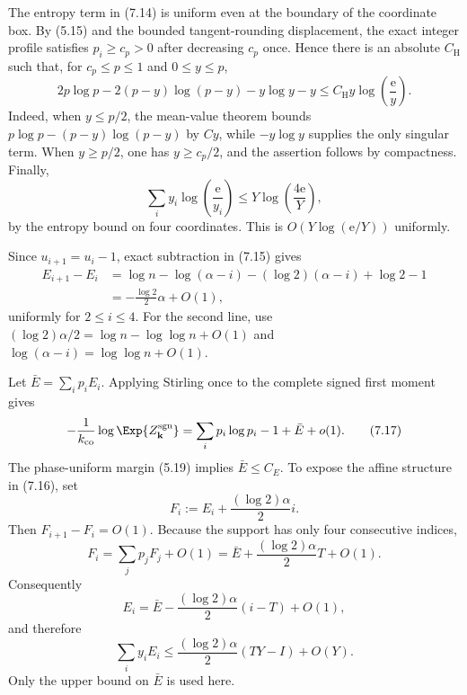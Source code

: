 The entropy term in (7.14) is uniform even at the boundary of the coordinate
box. By (5.15) and the bounded tangent-rounding displacement, the exact integer
profile satisfies $p_i\ge c_p>0$ after decreasing $c_p$ once. Hence there is an
absolute $C_{\mathrm H}$ such that, for $c_p\le p\le1$ and $0\le y\le p$,
\begin{equation*}
  2p\log p-2(p-y)\log(p-y)-y\log y-y
  \le C_{\mathrm H}y\log\!\left(\frac{\mathrm e}{y}\right).
  \tag{7.14a}
\end{equation*}
Indeed, when $y\le p/2$, the mean-value theorem bounds
$p\log p-(p-y)\log(p-y)$ by $Cy$, while $-y\log y$ supplies the only
singular term. When $y\ge p/2$, one has $y\ge c_p/2$, and the assertion follows
by compactness. Finally,
\[
  \sum_i y_i\log\!\left(\frac{\mathrm e}{y_i}\right)
  \le
  Y\log\!\left(\frac{4\mathrm e}{Y}\right),
\]
by the entropy bound on four coordinates. This is
$O(Y\log(\mathrm e/Y))$ uniformly.

Since $u_{i+1}=u_i-1$, exact subtraction in (7.15) gives
\begin{equation*}
\begin{aligned}
 E_{i+1}-E_i
 &=\log n-\log(\alpha-i)-(\log 2)(\alpha-i)+\log 2-1\\
 &=-\frac{\log 2}{2}\alpha+O(1),
\end{aligned}
 \tag{7.16}
\end{equation*}
uniformly for $2\le i\le4$. For the second line, use
$(\log 2)\alpha/2=\log n-\log\log n+O(1)$ and
$\log(\alpha-i)=\log\log n+O(1)$.

Let $\bar E=\sum_i p_iE_i$. Applying Stirling once to the complete signed
first moment gives
\begin{equation*}
 -\frac1{k_{\mathrm{co}}}
   \log \Exp{Z_{\mathbf k}^{\mathrm{sgn}}}
 =\sum_i p_i\log p_i-1+\bar E+o(1).
 \tag{7.17}
\end{equation*}
The phase-uniform margin (5.19) implies $\bar E\le C_E$. To expose the affine
structure in (7.16), set
\[
  F_i:=E_i+\frac{(\log 2)\alpha}{2}i.
\]
Then $F_{i+1}-F_i=O(1)$. Because the support has only four consecutive
indices,
\[
  F_i=\sum_jp_jF_j+O(1)
     =\bar E+\frac{(\log 2)\alpha}{2}T+O(1).
\]
Consequently
\[
  E_i=\bar E-\frac{(\log 2)\alpha}{2}(i-T)+O(1),
\]
and therefore
\begin{equation*}
 \sum_i y_iE_i
 \le\frac{(\log 2)\alpha}{2}(TY-I)+O(Y).
 \tag{7.18}
\end{equation*}
Only the upper bound on $\bar E$ is used here.

